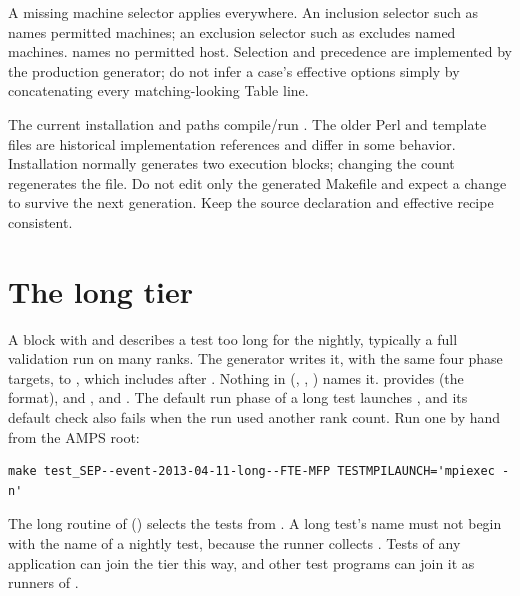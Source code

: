 A missing machine selector applies everywhere. An inclusion selector such
as  names permitted machines; an exclusion
selector such as  excludes named machines.
 names no permitted host. Selection and precedence are implemented
by the production generator; do not infer a case's effective options simply
by concatenating every matching-looking Table line.

The current  installation and  paths
compile/run . The older Perl
 and template files are historical
implementation references and differ in some behavior. Installation normally
generates two execution blocks; changing the count regenerates the file.
Do not edit only the generated Makefile and expect a change to survive the
next generation. Keep the source declaration and effective recipe consistent.

\section{The long tier}
A block with  and  describes a test too long
for the nightly, typically a full validation run on many ranks. The generator
writes it, with the same four phase targets, to ,
which  includes after . Nothing in
 (, ,
) names it.  provides
 (the  format),
 and , and
. The default run phase of a long test
launches , and its default
check also fails when the run used another rank count. Run one by hand from
the AMPS root:
\begin{lstlisting}
make test_SEP--event-2013-04-11-long--FTE-MFP TESTMPILAUNCH='mpiexec -n'
\end{lstlisting}
The long routine of  ()
selects the tests from . A long test's name
must not begin with the name of a nightly test, because the runner collects
. Tests of any application can join the tier this way,
and other test programs can join it as runners of .

